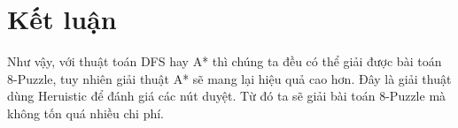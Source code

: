 \def\baselinestretch{1}
\chapter{Kết luận}
\ifpdf
    \graphicspath{{Conclusions/ConclusionsFigs/PNG/}{Conclusions/ConclusionsFigs/PDF/}{Conclusions/ConclusionsFigs/}}
\else
    \graphicspath{{Conclusions/ConclusionsFigs/EPS/}{Conclusions/ConclusionsFigs/}}
\fi

\def\baselinestretch{1.66}

Như vậy, với thuật toán DFS hay A* thì chúng ta đều có thể giải được bài toán 8-Puzzle, tuy nhiên giải thuật A* sẽ mang lại hiệu quả cao hơn. Đây là giải thuật dùng Heruistic để đánh giá các nút duyệt. Từ đó ta sẽ giải bài toán 8-Puzzle mà không tốn quá nhiều chi phí.